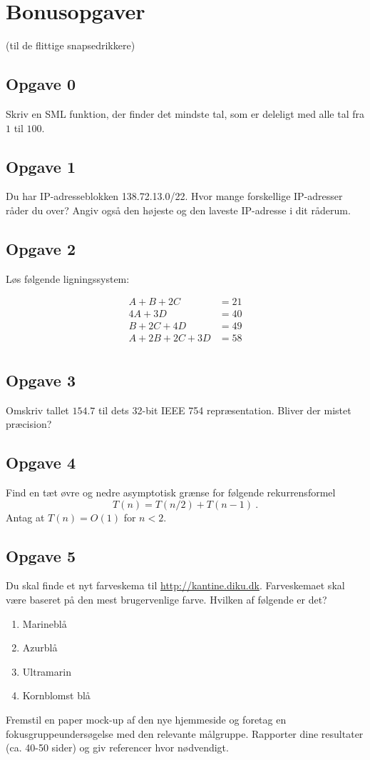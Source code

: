 \section{\huge{Bonusopgaver}}
(til de flittige snapsedrikkere)


\subsection{Opgave 0}
Skriv en SML funktion, der finder det mindste tal, som er deleligt med alle
tal fra $1$ til $100$.


\subsection{Opgave 1}
Du har IP-adresseblokken 138.72.13.0/22. Hvor mange forskellige IP-adresser
råder du over? Angiv også den højeste og den laveste IP-adresse i dit råderum.


\subsection{Opgave 2}
Løs følgende ligningssystem:

\begin{align*}
A + B + 2C &= 21 \\
4A + 3D &= 40 \\
B + 2C + 4D &= 49 \\
A + 2B + 2C + 3D &= 58 \\
\end{align*}


\subsection{Opgave 3}
Omskriv tallet $154.7$ til dets 32-bit IEEE 754 repræsentation. Bliver der
mistet præcision?

\subsection{Opgave 4}

Find en tæt øvre og nedre asymptotisk grænse for følgende rekurrensformel
\[
    T(n) = T(n/2) + T(n-1)\ .
\]
Antag at $T(n) = O(1)$ for $n < 2$.


\subsection{Opgave 5}
Du skal finde et nyt farveskema til \url{http://kantine.diku.dk}. Farveskemaet
skal være baseret på den mest brugervenlige farve. Hvilken af følgende er det?
\begin{enumerate}
    \item Marineblå
    \item Azurblå
    \item Ultramarin
    \item Kornblomst blå
\end{enumerate}
Fremstil en paper mock-up af den nye hjemmeside og foretag en
fokusgruppeundersøgelse med den relevante målgruppe. Rapporter dine resultater
(ca. 40-50 sider) og giv referencer hvor nødvendigt.


